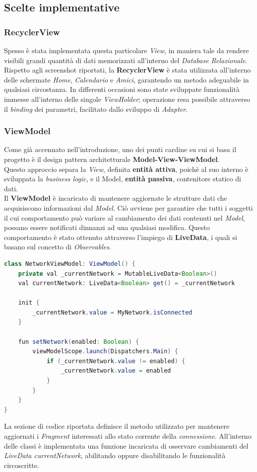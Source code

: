 \documentclass{article}
\begin{document}
\newpage
\subsection*{Scelte implementative}
\subsubsection*{RecyclerView}
Spesso è stata implementata questa particolare \textit{View}, in maniera tale da rendere visibili grandi quantità di dati memorizzati all'interno del \textit{Database Relazionale}. \vspace*{7pt}\\
Rispetto agli screenshot riportati, la \textbf{RecyclerView} è stata utilizzata all'interno delle schermate \textit{Home}, \textit{Calendario} e \textit{Amici}, garantendo un metodo adeguabile in qualsiasi circostanza. In differenti occasioni sono state sviluppate funzionalità immesse all'interno delle singole \textit{ViewHolder}; operazione resa possibile attraverso il \textit{binding} dei parametri, facilitato dallo sviluppo di \textit{Adapter}.
\subsubsection*{ViewModel}
Come già accennato nell'introduzione, uno dei punti cardine su cui si basa il progetto è il design pattern architetturale \textbf{Model-View-ViewModel}. \\
Questo approccio separa la \textit{View}, definita \textbf{entità attiva}, poichè al suo interno è sviluppata la \textit{business logic}, e il Model, \textbf{entità passiva}, contenitore statico di dati. \vspace*{7pt}\\
Il \textbf{ViewModel} è incaricato di mantenere aggiornate le strutture dati che acquisiscono informazioni dal \textit{Model}. Ciò avviene per garantire che tutti i soggetti il cui comportamento può variare al cambiamento dei dati contenuti nel \textit{Model}, possano essere notificati dinnanzi ad una qualsiasi modifica. Questo comportamento è stato ottenuto attraverso l'impiego di \textbf{LiveData}, i quali si basano sul concetto di \textit{Observables}.
\begin{lstlisting}[language = JAVA]
class NetworkViewModel: ViewModel() {
    private val _currentNetwork = MutableLiveData<Boolean>()
    val currentNetwork: LiveData<Boolean> get() = _currentNetwork

    init {
        _currentNetwork.value = MyNetwork.isConnected
    }
    
    fun setNetwork(enabled: Boolean) {
        viewModelScope.launch(Dispatchers.Main) {
            if (_currentNetwork.value != enabled) {
                _currentNetwork.value = enabled
            }
        }
    }
}
\end{lstlisting}
La sezione di codice riportata definisce il metodo utilizzato per mantenere aggiornati i \textit{Fragment} interessati allo stato corrente della \textit{connessione}. All'interno delle classi è implementata una funzione incaricata di osservare cambiamenti del \textit{LiveData currentNetwork}, abilitando oppure disabilitando le funzionalità circoscritte.
\end{document}
